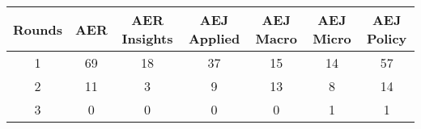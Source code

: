 
\begin{tabular}{ccccccc} 
\toprule 
Rounds & AER & AER Insights & AEJ Applied & AEJ Macro & AEJ Micro & AEJ Policy \\ 
\midrule 1 & 69 & 18 & 37 & 15 & 14 & 57 \\ 
2 & 11 & 3 & 9 & 13 & 8 & 14 \\ 
3 & 0 & 0 & 0 & 0 & 1 & 1 \\ 
\bottomrule 
\end{tabular} 
